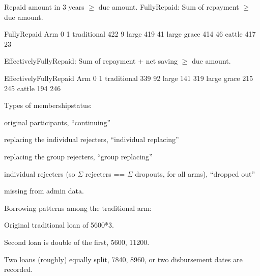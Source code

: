 \noindent
Repaid amount in 3 years $\geqslant$ due amount. FullyRepaid: Sum of repayment $\geqslant$ due amount.
\begin{Schunk}
\begin{Soutput}
             FullyRepaid
Arm             0   1
  traditional 422   9
  large       419  41
  large grace 414  46
  cattle      417  23
\end{Soutput}
\end{Schunk}
EffectivelyFullyRepaid: Sum of repayment + net saving $\geqslant$ due amount.
\begin{Schunk}
\begin{Soutput}
             EffectivelyFullyRepaid
Arm             0   1
  traditional 339  92
  large       141 319
  large grace 215 245
  cattle      194 246
\end{Soutput}
\end{Schunk}



Types of \textsf{membershipstatus}:
\begin{description}
\vspace{1.0ex}\setlength{\itemsep}{1.0ex}\setlength{\baselineskip}{12pt}
\item[continued]	original participants, ``continuing''
\item[replaced]	replacing the individual rejecters, ``individual replacing''
\item[new]	replacing the group rejecters, ``group replacing''
\item[dropouts]	individual rejecters (so $\Sigma$ rejecters == $\Sigma$ dropouts, for all arms), ``dropped out''
\item[group rejecters]	missing from admin data.
\end{description} 
\gobblepars

Borrowing patterns among the traditional arm: 
\begin{description}
\vspace{1.0ex}\setlength{\itemsep}{1.0ex}\setlength{\baselineskip}{12pt}
\item[planned]	Original traditional loan of 5600*3.
\item[double]	Second loan is double of the first, 5600, 11200.
\item[twice]	Two loans (roughly) equally split, 7840, 8960, or two disbursement dates are recorded.
\end{description}

